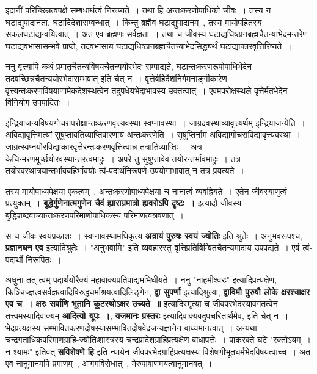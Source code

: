 	इदानीं परिच्छिन्नत्वपक्षे सम्बधार्थत्वं निरूप्यते~। तथा हि अन्तःकरणोपाधिको जीवः~। तस्य न घटाद्युपादानता, घटादिदेशासम्बन्धात्~। किन्तु ब्रह्मैव घटाद्युपादानम्~, तस्य मायोपहितस्य सकलघटाद्यन्वयित्वात्~। अत एव ब्रह्मणः सर्वज्ञता~। तथा च जीवस्य घटाद्यधिष्ठानब्रह्मचैतन्याभेदमन्तरेण घटाद्यवभासासम्भवे प्राप्ते, तदवभासाय घटाद्यधिष्ठानब्रह्मचैतन्याभेदसिद्ध्यर्थं घटाद्याकारवृत्तिरिष्यते~।\par
	ननु वृत्त्यापि कथं प्रमातृचैतन्यविषयचैतन्ययोरभेदः सम्पाद्यते, घटान्तःकरणरूपोपाधिभेदेन तदवच्छिन्नचैतन्ययोरभेदासम्भवात् इति चेत् न~। वृत्तेर्बहिर्देशनिर्गमनाङ्गीकारेण वृत्त्यन्तःकरणविषयाणामेकदेशस्थत्वेन तदुपधेयभेदाभावस्य उक्तत्वात्~। एवमपरोक्षस्थले वृत्तेर्मतभेदेन विनियोग उपपादितः~।\par
	इन्द्रियाजन्यविषयगोचरापरोक्षान्तःकरणवृत्त्यवस्था स्वप्नावस्था~। जाग्रदवस्थाव्यावृत्त्यर्थम् इन्द्रियाजन्येति~। अविद्यावृत्तिमत्यां सुषुप्तावतिव्याप्तिवारणाय अन्तःकरणेति~। सुषुप्तिर्नाम अविद्यागोचराविद्यावृत्त्यवस्था~। जाग्रत्स्वप्नयोरविद्याकारवृत्तेरन्तःकरणवृत्तित्वान्न तत्रातिव्याप्तिः~। अत्र केचिन्मरणमूर्च्छयोरवस्थान्तरत्वमाहुः~। अपरे तु सुषुप्तावेव तयोरन्तर्भावमाहुः~। तत्र तयोरवस्थात्रयान्तर्भावबहिर्भावयोः त्वं-पदार्थनिरूपणे उपयोगाभावात् न तत्र प्रयत्यते~।\par
	तस्य मायोपाध्यपेक्षया एकत्वम्~, अन्तःकरणोपाध्यपेक्षया च नानात्वं व्यवह्रियते~। एतेन जीवस्याणुत्वं प्रत्युक्तम्~। {\bfseries बुद्धेर्गुणेनात्मगुणेन चैवं ह्याराग्रमात्रो ह्यवरोऽपि दृष्टः~।} इत्यादौ जीवस्य बुद्धिशब्दवाच्यान्तःकरणपरिमाणोपाधिकस्य परिमाणत्वश्रवणात्~।\par
	स च जीवः स्वयंप्रकाशः~। स्वप्नावस्थामधिकृत्य {\bfseries अत्रायं पुरुषः स्वयं ज्योतिः} इति श्रुतेः~। अनुभवरूपश्च, {\bfseries प्रज्ञानघन एव} इत्यादिश्रुतेः~। "अनुभवामि" इति व्यवहारस्तु वृत्तिप्रतिबिम्बितचैतन्यमादाय उपपद्यते~। एवं त्वं-पदार्थो निरूपितः~।\par
	अधुना तत्-त्वम्-पदार्थयोरैक्यं महावाक्यप्रतिपाद्यमभिधीयते~। ननु "नाहमीश्वरः" इत्यादिप्रत्यक्षेण, किञ्चिज्ज्ञत्वसर्वज्ञत्वादिविरुद्धधर्माश्रयत्वादिलिङ्गेन, {\bfseries द्वा सुपर्णा} इत्यादिश्रुत्या, {\bfseries द्वाविमौ पुरुषौ लोके क्षरश्चाक्षर एव च~। क्षरः सर्वाणि भूतानि कूटस्थोऽक्षर उच्यते~॥} इत्यादिस्मृत्या च जीवपरभेदस्यावगतत्वेन तत्त्वमस्यादिवाक्यम् {\bfseries आदित्यो यूपः~।}, {\bfseries यजमानः प्रस्तरः} इत्यादिवाक्यवदुपचरितार्थमेव, इति चेत् न~। भेदप्रत्यक्षस्य सम्भावितकरणदोषस्यासम्भावितदोषवेदजन्यज्ञानेन बाध्यमानत्वात्~। अन्यथा चन्द्रगताधिकपरिमाणग्राहि-ज्योतिःशास्त्रस्य चन्द्रप्रादेशग्राहिप्रत्यक्षेण बाधापत्तेः~। पाकरक्ते घटे "रक्तोऽयम्~। न श्यामः" इतिवत् {\bfseries सविशेषणे हि} इति न्यायेन जीवपरभेदग्राहिप्रत्यक्षस्य विशेषणीभूतधर्मभेदविषयत्वाच्च~। अत एव नानुमानमपि प्रमाणम्~, आगमविरोधात्~, मेरुपाषाणमयत्वानुमानवत्~।\par
